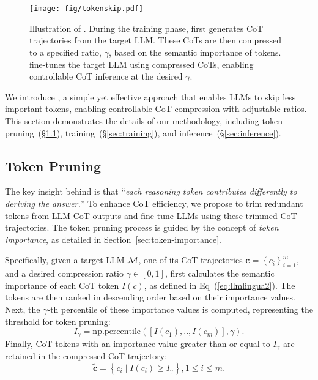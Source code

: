 \section{\method}
\label{sec:tokenskip}
\begin{figure*}[t]
\centering
\texttt{[image: fig/tokenskip.pdf]}
\caption{Illustration of \method. During the training phase, \method first generates CoT trajectories from the target LLM. These CoTs are then compressed to a specified ratio, $\gamma$, based on the semantic importance of tokens. \method fine-tunes the target LLM using compressed CoTs, enabling controllable CoT inference at the desired $\gamma$.}
\label{fig:tokenskip}
\end{figure*}

We introduce \method, a simple yet effective approach that enables LLMs to skip less important tokens, enabling controllable CoT compression with adjustable ratios. This section demonstrates the details of our methodology, including token pruning~(\S\ref{sec:token-pruning}), training~(\S\ref{sec:training}), and inference~(\S\ref{sec:inference}).

\subsection{Token Pruning}
\label{sec:token-pruning}
The key insight behind \method is that ``\textit{each reasoning token contributes differently to deriving the answer.}'' To enhance CoT efficiency, we propose to trim redundant tokens from LLM CoT outputs and fine-tune LLMs using these trimmed CoT trajectories. The token pruning process is guided by the concept of \textit{token importance}, as detailed in Section~\ref{sec:token-importance}. 

Specifically, given a target LLM $\mathcal{M}$, one of its CoT trajectories $\boldsymbol{c}=\left\{c_i\right\}_{i=1}^{m}$, and a desired compression ratio $\gamma \in \left[0,1\right]$, \method first calculates the semantic importance of each CoT token $I\left(c\right)$, as defined in Eq~(\ref{eq:llmlingua2}). The tokens are then ranked in descending order based on their importance values. Next, the $\gamma$-th percentile of these importance values is computed, representing the threshold for token pruning:
\begin{equation}
I_\gamma=\mathrm{np.percentile}\left(\left[I\left(c_1\right), . ., I\left(c_m\right)\right], \gamma\right).
\end{equation}
Finally, CoT tokens with an importance value greater than or equal to $I_\gamma$ are retained in the compressed CoT trajectory:
\begin{equation}
\widetilde{\boldsymbol{c}}=\left\{c_i \mid I\left(c_i\right) \geq I_\gamma\right\}, 1 \leq i \leq m.
\end{equation}

